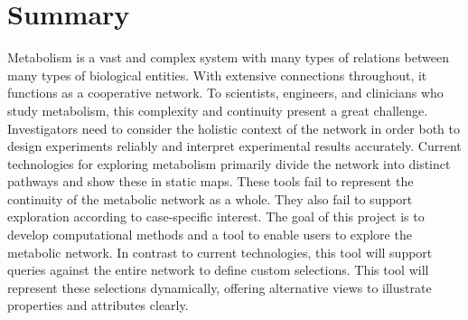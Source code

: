 

\section{Summary}

Metabolism is a vast and complex system with many types of relations between many types of biological entities.
With extensive connections throughout, it functions as a cooperative network.
To scientists, engineers, and clinicians who study metabolism, this complexity and continuity present a great challenge.
Investigators need to consider the holistic context of the network in order both to design experiments reliably and interpret experimental results accurately.
Current technologies for exploring metabolism primarily divide the network into distinct pathways and show these in static maps.
These tools fail to represent the continuity of the metabolic network as a whole.
They also fail to support exploration according to case-specific interest.
The goal of this project is to develop computational methods and a tool to enable users to explore the metabolic network.
In contrast to current technologies, this tool will support queries against the entire network to define custom selections.
This tool will represent these selections dynamically, offering alternative views to illustrate properties and attributes clearly.
